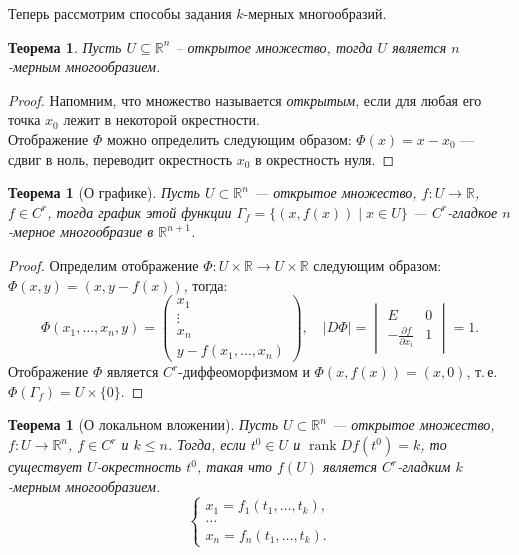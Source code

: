 \documentclass[a5paper]{article}
\newcounter{through}
\theoremstyle{plain}
\newtheorem{theorem}[through]{Теорема}
\theoremstyle{definition}
\numberwithin{through}{section}
\numberwithin{equation}{section}
\DeclareMathOperator{\rank}{rank}
\begin{document}
Теперь рассмотрим способы задания $k$-мерных многообразий.

\begin{theorem}%
	\label{OpenSetManifold}
	Пусть $U \subseteq \mathbb{R}^n$ -- открытое множество, тогда $U$ является
	$n$-мерным многообразием.
\end{theorem} 
\begin{proof}
	Напомним, что множество называется \textit{открытым}, если для любая его точка $x_0$ лежит в некоторой окрестности.\\
	Отображение $\Phi$ можно определить следующим образом:
	$\Phi(x)=x-x_0$ --- сдвиг в ноль, переводит окрестность $x_0$ в окрестность нуля.
\end{proof}

\begin{theorem}[О графике]
	Пусть $U \subset \mathbb{R}^n$ --- открытое множество, $f: U \to \mathbb{R}$, $f \in C^r$, тогда график этой функции $\Gamma_f =
	\{ (x, f(x))  \mid x \in U \}$ --- $C^r$-гладкое $n$-мерное многообразие в $\mathbb{R}^{n+1}$.
\end{theorem}

\begin{proof}
	Определим отображение $\Phi : U \times \mathbb{R} \to U \times \mathbb{R}$ следующим образом: $\Phi(x, y) = (x, y - f(x))$, тогда:
\[
\Phi(x_1, \ldots, x_n, y) =
	\begin{pmatrix}
	x_1 \\
	\vdots \\
	x_n \\
	y - f(x_1, \ldots, x_n)
	\end{pmatrix},
	\quad
	\left| D \Phi \right|=
	\begin{vmatrix}
	E& 0 \\
	-\frac{\partial f}{\partial x_i} & 1
	\end{vmatrix}
	= 1.
\]
	Отображение $\Phi$ является $C^r$-диффеоморфизмом и $\Phi(x,f(x)) = (x, 0)$, т.\,е. $\Phi(\Gamma_f) = U \times \{0\}$.
\end{proof}

\begin{theorem}[О локальном вложении]

	Пусть $U \subset \mathbb{R}^n$ --- открытое множество, $f: U \to \mathbb{R}^n$, $f \in C^r$ и $k \leq n $. Тогда, если $t^0 \in U$ и $\rank Df(t^0) = k$, то существует $U$-окрестность $t^0$, такая что $f(U)$ является $C^r$-гладким $k$-мерным многообразием.
		\begin{equation*}
	\begin{cases}
	x_1 = f_1(t_1,\ldots,t_k), \\
	\ldots \\
	x_n = f_n(t_1,\ldots, t_k).
	\end{cases}
	\end{equation*}
\end{theorem}
\end{document}
